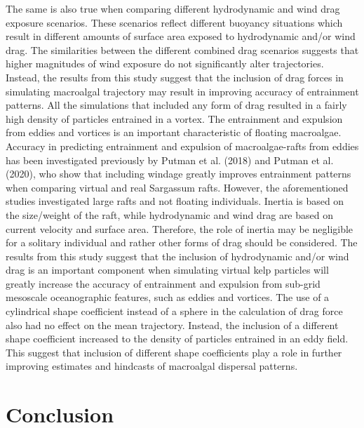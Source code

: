 \documentclass[
]{article}
\begin{document}
The same is also true when comparing different hydrodynamic and wind
drag exposure scenarios. These scenarios reflect different buoyancy
situations which result in different amounts of surface area exposed to
hydrodynamic and/or wind drag. The similarities between the different
combined drag scenarios suggests that higher magnitudes of wind exposure
do not significantly alter trajectories. Instead, the results from this
study suggest that the inclusion of drag forces in simulating macroalgal
trajectory may result in improving accuracy of entrainment patterns. All
the simulations that included any form of drag resulted in a fairly high
density of particles entrained in a vortex. The entrainment and
expulsion from eddies and vortices is an important characteristic of
floating macroalgae. Accuracy in predicting entrainment and expulsion of
macroalgae-rafts from eddies has been investigated previously by Putman
et al. (2018) and Putman et al. (2020), who show that including windage
greatly improves entrainment patterns when comparing virtual and real
Sargassum rafts. However, the aforementioned studies investigated large
rafts and not floating individuals. Inertia is based on the size/weight
of the raft, while hydrodynamic and wind drag are based on current
velocity and surface area. Therefore, the role of inertia may be
negligible for a solitary individual and rather other forms of drag
should be considered. The results from this study suggest that the
inclusion of hydrodynamic and/or wind drag is an important component
when simulating virtual kelp particles will greatly increase the
accuracy of entrainment and expulsion from sub-grid mesoscale
oceanographic features, such as eddies and vortices. The use of a
cylindrical shape coefficient instead of a sphere in the calculation of
drag force also had no effect on the mean trajectory. Instead, the
inclusion of a different shape coefficient increased to the density of
particles entrained in an eddy field. This suggest that inclusion of
different shape coefficients play a role in further improving estimates
and hindcasts of macroalgal dispersal patterns.

\hypertarget{conclusion}{%
\section{Conclusion}\label{conclusion}}
\end{document}
